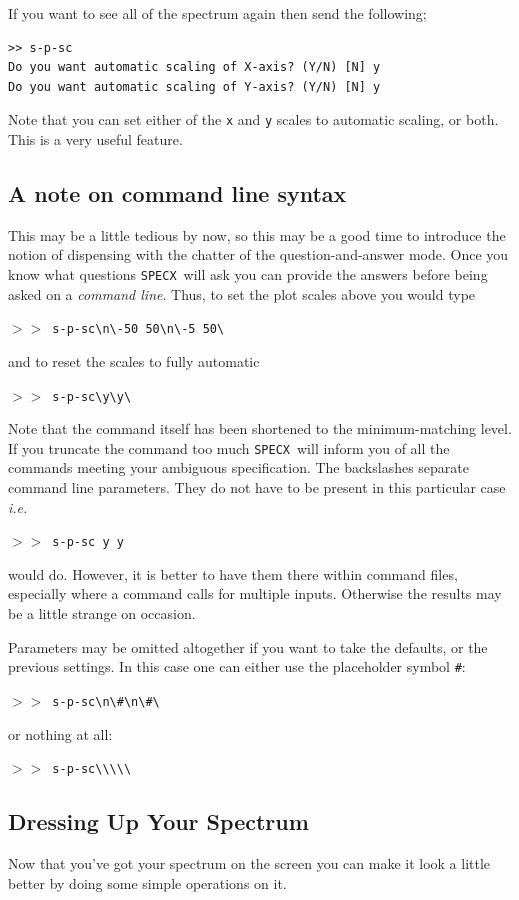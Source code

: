 \documentclass[11pt,twoside]{article}
\newcommand{\ie}{{\it i.e.}}
\newcommand{\SPECX}{{\tt SPECX}}
\newcommand{\SP}{{$>\!>$}}
\begin{document}
If you want to see all of the spectrum again then send the following;

\begin{verbatim}
>> s-p-sc
Do you want automatic scaling of X-axis? (Y/N) [N] y
Do you want automatic scaling of Y-axis? (Y/N) [N] y
\end{verbatim}

Note that you can set either of the {\tt x} and {\tt y} scales to
automatic scaling, or both. This is a very useful feature.

\subsection{A note on command line syntax}
\label{sec:command-line}
This may be a little tedious by now, so this may be a good time to
introduce the notion of dispensing with the chatter of the
question-and-answer mode.  Once you know what questions \SPECX\ will
ask you can provide the answers before being asked on a {\it command
line}.  Thus, to set the plot scales above you would type

\SP\ \verb|s-p-sc\n\-50 50\n\-5 50\ |

and to reset the scales to fully automatic

\SP\ \verb|s-p-sc\y\y\ |

Note that the command itself has been shortened to the
minimum-matching level.  If you truncate the command too much \SPECX\
will inform you of all the commands meeting your ambiguous
specification. The backslashes separate command line parameters. They
do not have to be present in this particular case \ie\

\SP\ \verb|s-p-sc y y |

would do. However, it is better to have them there within command
files, especially where a command calls for multiple inputs. Otherwise
the results may be a little strange on occasion.

Parameters may be omitted altogether if you want to take the defaults,
or the previous settings. In this case one can either use the
placeholder symbol
\verb+#+: 

\SP\ \verb|s-p-sc\n\#\n\#\ |

or nothing at all:

\SP\ \verb|s-p-sc\\\\\ |

\subsection{Dressing Up Your Spectrum}
\label{sec:specx_5.2}
Now that you've got your spectrum on the screen you can make it look a
little better by doing some simple operations on it.  
\end{document}

